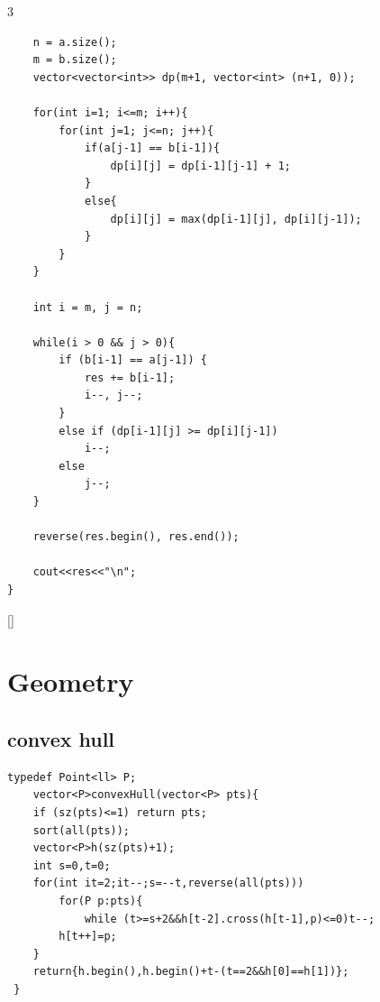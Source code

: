 \documentclass[twoside]{article}
\begin{document}
\begin{multicols*}{3}
\begin{verbatim}
    n = a.size();
    m = b.size();
    vector<vector<int>> dp(m+1, vector<int> (n+1, 0));

    for(int i=1; i<=m; i++){
        for(int j=1; j<=n; j++){
            if(a[j-1] == b[i-1]){
                dp[i][j] = dp[i-1][j-1] + 1;
            }
            else{
                dp[i][j] = max(dp[i-1][j], dp[i][j-1]);
            }
        }
    }

    int i = m, j = n;

    while(i > 0 && j > 0){
        if (b[i-1] == a[j-1]) {
            res += b[i-1];
            i--, j--;
        }
        else if (dp[i-1][j] >= dp[i][j-1]) 
            i--;
        else
            j--;
    }

    reverse(res.begin(), res.end());

    cout<<res<<"\n";
}
\end{verbatim}

{
[\vspace{2em}]
\section*{Geometry}
}
{
\subsection*{convex hull}
}
\begin{verbatim}
typedef Point<ll> P;
    vector<P>convexHull(vector<P> pts){
    if (sz(pts)<=1) return pts;
    sort(all(pts));
    vector<P>h(sz(pts)+1);
    int s=0,t=0;
    for(int it=2;it--;s=--t,reverse(all(pts)))
        for(P p:pts){
            while (t>=s+2&&h[t-2].cross(h[t-1],p)<=0)t--;
        h[t++]=p;
    }
    return{h.begin(),h.begin()+t-(t==2&&h[0]==h[1])};
 }
\end{verbatim}

{
}
\end{multicols*}
\end{document}
